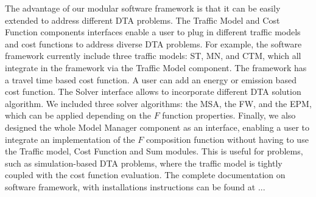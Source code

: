 The advantage of our modular software framework is that it can be easily extended to address different DTA problems. The Traffic Model and Cost Function components interfaces enable a user to plug in different traffic models and cost functions to address diverse DTA problems. For example, the software framework currently include three traffic models: ST, MN, and CTM, which all integrate in the framework via the Traffic Model component. The framework has a travel time based cost function. A user can add an energy or emission based cost function. The Solver interface allows to incorporate different DTA solution algorithm. We included three solver algorithms: the MSA, the FW, and the EPM, which can be applied depending on the $F$ function properties. Finally, we also designed the whole Model Manager component as an interface, enabling a user to integrate an implementation of the $F$ composition function without having to use the Traffic model, Cost Function and Sum modules. This is useful for problems, such as simulation-based DTA problems, where the traffic model is tightly coupled with the cost function evaluation. The complete documentation on software framework, with installations instructions can be found at ...

